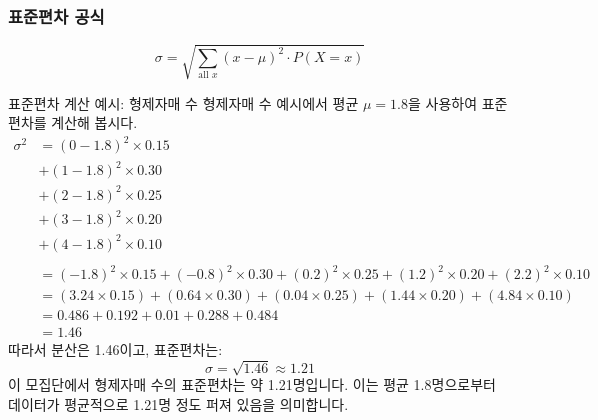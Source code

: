 \documentclass[11pt,a4paper]{article}
\begin{document}
\subsubsection*{표준편차 공식}
\[ \sigma = \sqrt{\sum_{\text{all } x} (x - \mu)^2 \cdot P(X=x)} \]

\begin{examplebox}{표준편차 계산 예시: 형제자매 수}
형제자매 수 예시에서 평균 \(\mu = 1.8\)을 사용하여 표준편차를 계산해 봅시다.
\begin{align*} \sigma^2 &= (0 - 1.8)^2 \times 0.15 \\ &+ (1 - 1.8)^2 \times 0.30 \\ &+ (2 - 1.8)^2 \times 0.25 \\ &+ (3 - 1.8)^2 \times 0.20 \\ &+ (4 - 1.8)^2 \times 0.10 \\ \\ &= (-1.8)^2 \times 0.15 + (-0.8)^2 \times 0.30 + (0.2)^2 \times 0.25 + (1.2)^2 \times 0.20 + (2.2)^2 \times 0.10 \\ &= (3.24 \times 0.15) + (0.64 \times 0.30) + (0.04 \times 0.25) + (1.44 \times 0.20) + (4.84 \times 0.10) \\ &= 0.486 + 0.192 + 0.01 + 0.288 + 0.484 \\ &= 1.46 \end{align*}
따라서 분산은 1.46이고, 표준편차는:
\[ \sigma = \sqrt{1.46} \approx 1.21 \]
이 모집단에서 형제자매 수의 표준편차는 약 1.21명입니다. 이는 평균 1.8명으로부터 데이터가 평균적으로 1.21명 정도 퍼져 있음을 의미합니다.
\end{examplebox}
\end{document}
